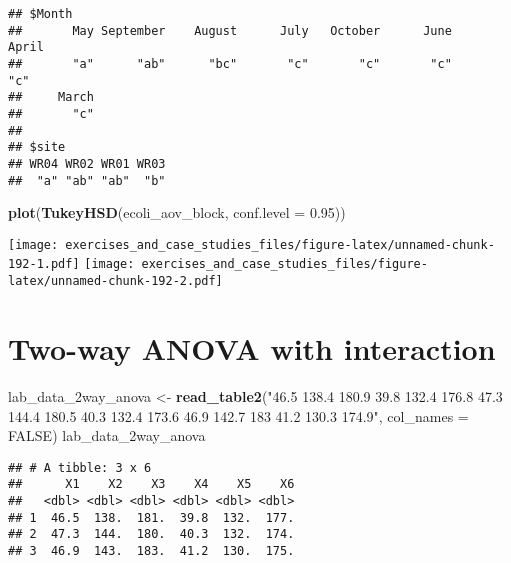 \documentclass[]{book}
\newenvironment{Shaded}{\begin{snugshade}}{\end{snugshade}}
\newcommand{\DataTypeTok}[1]{\textcolor[rgb]{0.13,0.29,0.53}{#1}}
\newcommand{\FloatTok}[1]{\textcolor[rgb]{0.00,0.00,0.81}{#1}}
\newcommand{\KeywordTok}[1]{\textcolor[rgb]{0.13,0.29,0.53}{\textbf{#1}}}
\newcommand{\NormalTok}[1]{#1}
\newcommand{\OtherTok}[1]{\textcolor[rgb]{0.56,0.35,0.01}{#1}}
\newcommand{\StringTok}[1]{\textcolor[rgb]{0.31,0.60,0.02}{#1}}
\theoremstyle{definition}
\theoremstyle{definition}
\theoremstyle{definition}
\theoremstyle{remark}
\begin{document}
\begin{verbatim}
## $Month
##       May September    August      July   October      June     April 
##       "a"      "ab"      "bc"       "c"       "c"       "c"       "c" 
##     March 
##       "c" 
## 
## $site
## WR04 WR02 WR01 WR03 
##  "a" "ab" "ab"  "b"
\end{verbatim}

\begin{Shaded}
\begin{Highlighting}[]
\KeywordTok{plot}\NormalTok{(}\KeywordTok{TukeyHSD}\NormalTok{(ecoli_aov_block, }\DataTypeTok{conf.level =} \FloatTok{0.95}\NormalTok{))}
\end{Highlighting}
\end{Shaded}

\texttt{[image: exercises\_and\_case\_studies\_files/figure-latex/unnamed-chunk-192-1.pdf]}
\texttt{[image: exercises\_and\_case\_studies\_files/figure-latex/unnamed-chunk-192-2.pdf]}

\hypertarget{two-way-anova-with-interaction}{%
\section{Two-way ANOVA with
interaction}\label{two-way-anova-with-interaction}}

\begin{Shaded}
\begin{Highlighting}[]
\NormalTok{lab_data_2way_anova <-}\StringTok{ }\KeywordTok{read_table2}\NormalTok{(}\StringTok{"46.5    138.4   180.9   39.8    132.4   176.8}
\StringTok{                                   47.3 144.4   180.5   40.3    132.4   173.6}
\StringTok{                                   46.9 142.7   183 41.2    130.3   174.9"}\NormalTok{, }\DataTypeTok{col_names =} \OtherTok{FALSE}\NormalTok{)}
\NormalTok{lab_data_2way_anova}
\end{Highlighting}
\end{Shaded}

\begin{verbatim}
## # A tibble: 3 x 6
##      X1    X2    X3    X4    X5    X6
##   <dbl> <dbl> <dbl> <dbl> <dbl> <dbl>
## 1  46.5  138.  181.  39.8  132.  177.
## 2  47.3  144.  180.  40.3  132.  174.
## 3  46.9  143.  183.  41.2  130.  175.
\end{verbatim}
\end{document}
